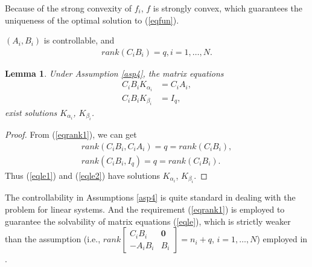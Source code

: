 \documentclass[final,5p,times,twocolumn,authoryear]{elsarticle}
\newtheorem{lemma}{ {Lemma}}
\begin{document}
\begin{remark}
	Because of the strong convexity of $f_i$, $f$ is strongly convex, which guarantees the uniqueness of the optimal solution to (\ref{eqfun}).
\end{remark}

\begin{assumption} \label{asp4}
	$(A_i,B_i)$ is controllable, and
	\begin{align}
		rank(C_iB_i)=q,i=1,\dots,N.\label{eqrank1}
	\end{align}
\end{assumption}

\begin{lemma}\label{lemma3}
	Under Assumption \ref{asp4}, the matrix equations
	\begin{subequations}\label{eqle}
		\begin{align}
			C_iB_iK_{\alpha_i}&=C_iA_i,\label{eqle1}\\
			C_iB_iK_{\beta_i}&=I_q,\label{eqle2}
		\end{align}
	\end{subequations}
	exist solutions $K_{\alpha_i}$, $K_{\beta_i}$.
\end{lemma}

\begin{proof}
	From (\ref{eqrank1}), we can get
	\begin{subequations}\label{eqrank2}
		\begin{align}
			rank(C_iB_i, C_iA_i)=q=rank(C_iB_i),\label{eqrank2a}\\
			rank(C_iB_i, I_q)=q=rank(C_iB_i).\label{eqrank2b}
		\end{align}
	\end{subequations}
	Thus (\ref{eqle1}) and (\ref{eqle2}) have solutions $K_{\alpha_i}$, $K_{\beta_i}$.
\end{proof}


\begin{remark}
	The controllability in Assumptions \ref{asp4} is quite standard in dealing with the problem for linear systems. And the requirement (\ref{eqrank1}) is employed to guarantee the solvability of matrix equations (\ref{eqle}), which is strictly weaker than the assumption (i.e., $rank\begin{bmatrix} C_iB_i &\boldsymbol0\\ -A_iB_i &B_i \end{bmatrix} = n_i+q$, $i=1,\dots,N$) employed in \citep{li2020,zhang2020}.
\end{remark}
\end{document}
